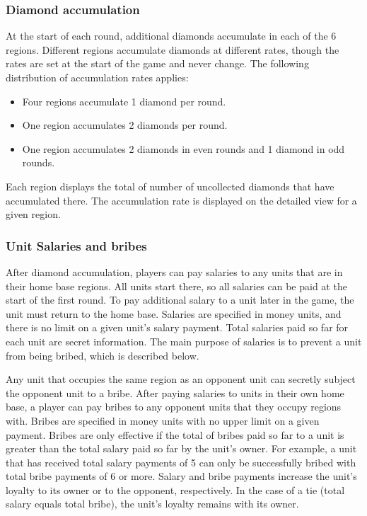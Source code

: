 \subsubsection{Diamond accumulation}

At the start of each round, additional diamonds accumulate in each of the 6 regions.  Different regions accumulate diamonds at different rates, though the rates are set at the start of the game and never change.  The following distribution of accumulation rates applies:
\begin{itemize}
\item Four regions accumulate 1 diamond per round.
\item One region accumulates 2 diamonds per round.
\item One region accumulates 2 diamonds in even rounds and 1 diamond in odd rounds.
\end{itemize}
Each region displays the total of number of uncollected diamonds that have accumulated there.  The accumulation rate is displayed on the detailed view for a given region.


\subsubsection{Unit Salaries and bribes}

After diamond accumulation, players can pay salaries to any units that are in their home base regions.  All units start there, so all salaries can be paid at the start of the first round.  To pay additional salary to a unit later in the game, the unit must return to the home base.  Salaries are specified in money units, and there is no limit on a given unit's salary payment.  Total salaries paid so far for each unit are secret information.  The main purpose of salaries is to prevent a unit from being bribed, which is described below.

Any unit that occupies the same region as an opponent unit can secretly subject the opponent unit to a bribe.  After paying salaries to units in their own home base, a player can pay bribes to any opponent units that they occupy regions with.  Bribes are specified in money units with no upper limit on a given payment.  Bribes are only effective if the total of bribes paid so far to a unit is greater than the total salary paid so far by the unit's owner.  For example, a unit that has received total salary payments of 5 can only be successfully bribed with total bribe payments of 6 or more.  Salary and bribe payments increase the unit's loyalty to its owner or to the opponent, respectively.  In the case of a tie (total salary equals total bribe), the unit's loyalty remains with its owner. 


